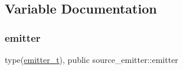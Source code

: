 \subsection{Variable Documentation}
\mbox{\label{namespacesource__emitter_a357876a84a74e23c44e92ab8ef7dc35e}} 
\subsubsection{\texorpdfstring{emitter}{emitter}}
{\footnotesize\ttfamily type(\mbox{\hyperlink{structsource__emitter_1_1emitter__t}{emitter\+\_\+t}}), public source\+\_\+emitter\+::emitter}

